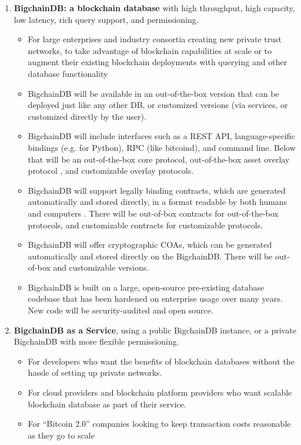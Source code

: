 \begin{enumerate}
 \item \textbf{BigchainDB: a blockchain database} with high throughput, high capacity, low latency, rich query support, and permissioning.
 \begin{itemize}
  \item For large enterprises and industry consortia creating new private trust networks, to take advantage of blockchain capabilities at scale or to augment their existing blockchain deployments with querying and other database functionality
  \item BigchainDB will be available in an out-of-the-box version that can be deployed just like any other DB, or customized versions (via services, or customized directly by the user).
  \item BigchainDB will include interfaces such as a REST API, language-specific bindings (e.g. for Python), RPC (like bitcoind), and command line. Below that will be an out-of-the-box core protocol, out-of-the-box asset overlay protocol \cite{dejonghe_spool}, and customizable overlay protocols.
  \item BigchainDB will support legally binding contracts, which are generated automatically and stored directly, in a format readable by both humans and computers \cite{grigg2004ricardian}. There will be out-of-box contracts for out-of-the-box protocols, and customizable contracts for customizable protocols.
  \item BigchainDB will offer cryptographic COAs, which can be generated automatically and stored directly on the BigchainDB. There will be out-of-box and customizable versions.
  \item BigchainDB is built on a large, open-source pre-existing database codebase that has been hardened on enterprise usage over many years. New code will be security-audited and open source.
 \end{itemize}
 \item \textbf{BigchainDB as a Service}, using a public BigchainDB instance, or a private BigchainDB with more flexible permissioning.
 \begin{itemize}
  \item For developers who want the benefits of blockchain databases without the hassle of setting up private networks.
  \item For cloud providers and blockchain platform providers who want scalable blockchain database as part of their service.
  \item For “Bitcoin 2.0” companies looking to keep transaction costs reasonable as they go to scale

\end{itemize}
\end{enumerate}
